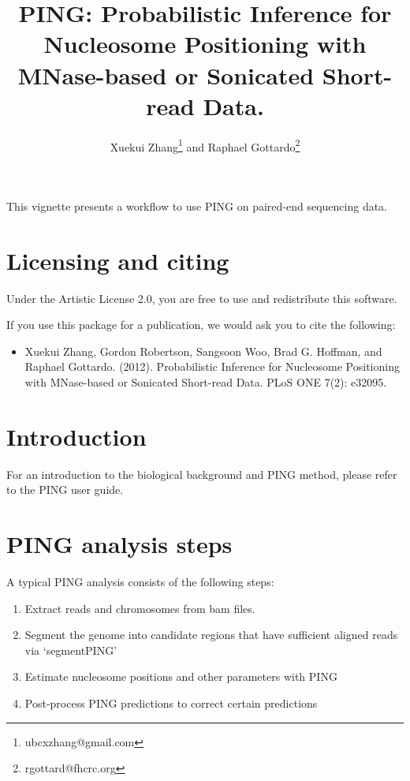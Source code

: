 \documentclass[11pt]{article}
\author{Xuekui Zhang\footnote{ubcxzhang@gmail.com} and Raphael
  Gottardo\footnote{rgottard@fhcrc.org}}
\begin{document}

\title{PING: Probabilistic Inference for Nucleosome Positioning with MNase-based or Sonicated Short-read Data.}
\maketitle



\textnormal {\normalfont}
This vignette presents a workflow to use PING on paired-end sequencing data.

\tableofcontents
\newpage


\section{Licensing and citing}

Under the Artistic License 2.0, you are free to use and redistribute this software. 

If you use this package for a publication, we would ask you to cite the following: 

\begin{itemize}
\item[] Xuekui Zhang, Gordon Robertson, Sangsoon Woo, Brad G. Hoffman, and Raphael Gottardo. (2012). Probabilistic Inference for Nucleosome Positioning with MNase-based or Sonicated Short-read Data. PLoS ONE 7(2): e32095.
\end{itemize}


\section{Introduction}
For an introduction to the biological background and PING method, please refer to the PING user guide.


\section{PING analysis steps}
A typical PING analysis consists of the following steps:
\begin{enumerate}
  \item Extract reads and chromosomes from bam files.
  \item Segment the genome into candidate regions that have sufficient aligned reads via `segmentPING'
  \item Estimate nucleosome positions and other parameters with PING
  \item Post-process PING predictions to correct certain predictions
\end{enumerate}
\end{document}
